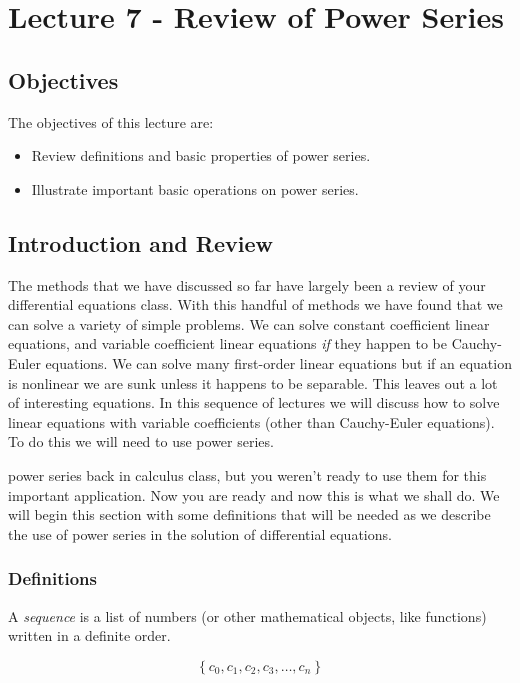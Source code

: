 \chapter{Lecture 7 - Review of Power Series}
\label{ch:lec7}
\section{Objectives}
The objectives of this lecture are:
\begin{itemize}
\item Review definitions and basic properties of power series.
\item Illustrate important basic operations on power series.
\end{itemize}

\section{Introduction and Review}
The methods that we have discussed so far have largely been a review of your differential equations class.  With this handful of methods we have found that we can solve a variety of simple problems.  We can solve constant coefficient linear equations, and variable coefficient linear equations \emph{if} they happen to be Cauchy-Euler equations.  We can solve many first-order linear equations but if an equation is nonlinear we are sunk unless it happens to be separable.  This leaves out a lot of interesting equations.  In this sequence of lectures we will discuss how to solve linear equations with variable coefficients (other than Cauchy-Euler equations).  To do this we will need to use power series. 

 power series back in calculus class, but you weren't ready to use them for this important application.  Now you are ready and now this is what we shall do.  We will begin this section with some definitions that will be needed as we describe the use of power series in the solution of differential equations.

\subsection{Definitions}
\begin{definition}[Sequence]
A \emph{sequence} is a list of numbers (or other mathematical objects, like functions) written in a definite order.

\begin{equation*}
\left\{c_0, c_1, c_2, c_3, \dots , c_n\right\}
\end{equation*}
\end{definition}

